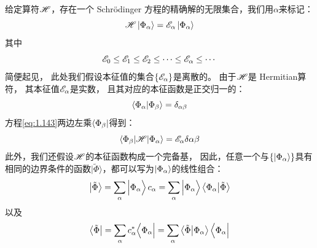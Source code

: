 给定算符$\mathscr{H}$，存在一个 Schr\"odinger 方程的精确解的无限集合，我们用$\alpha$来标记：
\begin{equation}
 \mathscr{H}\Ket{\Phi_\alpha} = \mathscr{E}_\alpha\Ket{\Phi_\alpha}
 \label{eq:1.143}
\end{equation}
其中
\[
\mathscr{E}_0 \leq \mathscr{E}_1 \leq \mathscr{E}_2 \leq \cdots \leq \mathscr{E}_\alpha \leq \cdots
\]
简便起见，
此处我们假设本征值的集合$\left\{\mathscr{E}_\alpha\right\}$是离散的。
由于$\mathscr{H}$是 Hermitian算符，
其本征值$\mathscr{E}_\alpha$是实数，
且其对应的本征函数是正交归一的：
\begin{equation}
 \langle \Phi_\alpha \vert \Phi_\beta \rangle = \delta_{\alpha\beta}
 \label{eq:1.144}
\end{equation}
方程\eqref{eq:1.143}两边左乘$\Bra{\Phi_\beta}$得到：
\begin{equation}
 \left\langle \Phi_\beta\middle\vert \mathscr{H} \middle\vert \Phi_\alpha\right\rangle = \mathscr{E}_\alpha\delta{\alpha\beta}
 \label{eq:1.145}
\end{equation}
此外，我们还假设$\mathscr{H}$的本征函数构成一个完备基，
因此，任意一个与$\left\{\Ket{\Phi_\alpha}\right\}$具有相同的边界条件的函数$\vert\tilde{\Phi}\rangle$，都可以写为$\Ket{\Phi_\alpha}$的线性组合：
\begin{equation}
 \Ket{\tilde{\Phi}} = \sum_\alpha \mathinner{\Big\vert\Phi_\alpha\Big\rangle} c_\alpha = \sum_\alpha \Big\vert\Phi_\alpha\Big\rangle \left\langle \Phi_\alpha \middle\vert \tilde{\Phi} \right\rangle
 \label{eq:1.146}
\end{equation}
以及
\begin{equation}
 \Bra{\tilde\Phi} = \sum_\alpha c_\alpha^\ast \Big\langle\Phi_\alpha\Big\vert = \sum_\alpha \left\langle \tilde\Phi \middle\vert \Phi_\alpha \right\rangle\Big\langle\Phi_\alpha\Big\vert
 \label{eq:1.147}
\end{equation}

